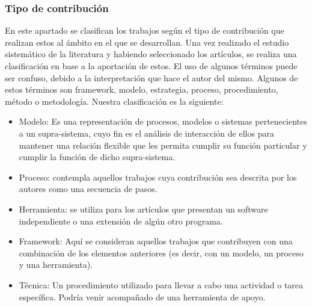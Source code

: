 \subsubsection{Tipo de contribución}
En este apartado se clasifican los trabajos según el tipo de contribución que realizan estos al ámbito en el que se desarrollan. Una vez realizado el estudio sistemático de la literatura y habiendo seleccionado los artículos, se realiza una clasificación en base a la aportación de estos. El uso de algunos términos puede ser confuso, debido a la interpretación que hace el autor del mismo. Algunos de estos términos son framework, modelo, estrategia, proceso, procedimiento, método o metodología. Nuestra clasificación es la siguiente:
\begin{itemize}
\item Modelo: Es una representación de procesos, modelos o sistemas pertenecientes a un supra-sistema, cuyo fin es el análisis de interacción de ellos para mantener una relación flexible que les permita cumplir su función particular y cumplir la función de dicho supra-sistema.
\item Proceso: contempla aquellos trabajos cuya contribución sea descrita por los autores como una secuencia de pasos.
\item Herramienta: se utiliza para los artículos que presentan un software independiente o una extensión de algún otro programa.
\item Framework: Aquí se consideran aquellos trabajos que contribuyen con una combinación de los elementos anteriores (es decir, con un modelo, un proceso y una herramienta).
\item Técnica: Un procedimiento utilizado para llevar a cabo una actividad o tarea específica. Podría venir acompañado de una herramienta de apoyo.
\end{itemize}

